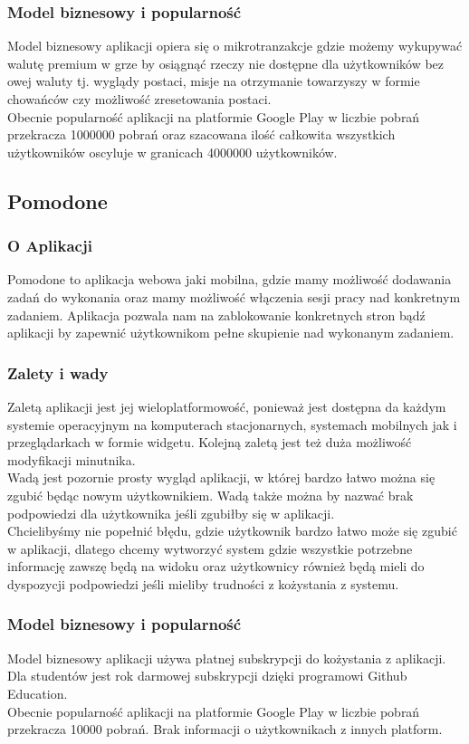 \documentclass[a4paper,11pt]{report}
\begin{document}
\subsubsection{Model biznesowy i popularność}
Model biznesowy aplikacji opiera się o mikrotranzakcje gdzie możemy wykupywać walutę premium w grze by osiągnąć rzeczy nie dostępne dla użytkowników bez owej waluty tj. wyglądy postaci, misje na otrzymanie towarzyszy w formie chowańców czy możliwość zresetowania postaci.\vspace{0,5cm}\\
Obecnie popularność aplikacji na platformie Google Play w liczbie pobrań przekracza 1000000 pobrań oraz szacowana ilość całkowita wszystkich użytkowników oscyluje w granicach 4000000 użytkowników.
\subsection{Pomodone}
\subsubsection{O Aplikacji}
Pomodone to aplikacja webowa jaki mobilna, gdzie mamy możliwość dodawania zadań do wykonania oraz mamy możliwość włączenia sesji pracy nad konkretnym zadaniem. Aplikacja pozwala nam na zablokowanie konkretnych stron bądź aplikacji by zapewnić użytkownikom pełne skupienie nad wykonanym zadaniem.
\subsubsection{Zalety i wady}
Zaletą aplikacji jest jej wieloplatformowość, ponieważ jest dostępna da każdym systemie operacyjnym na komputerach stacjonarnych, systemach mobilnych jak i przeglądarkach w formie widgetu. Kolejną zaletą jest też duża możliwość modyfikacji minutnika.\vspace{0,5cm}\\ Wadą jest pozornie prosty wygląd aplikacji, w której bardzo łatwo można się zgubić będąc nowym użytkownikiem. Wadą także można by nazwać brak podpowiedzi dla użytkownika jeśli zgubiłby się w aplikacji.
\vspace{0,5cm}\\Chcielibyśmy nie popełnić błędu, gdzie użytkownik bardzo łatwo może się zgubić w aplikacji, dlatego chcemy wytworzyć system gdzie wszystkie potrzebne informację zawszę będą na widoku oraz użytkownicy również będą mieli do dyspozycji podpowiedzi jeśli mieliby trudności z kożystania z systemu.
\subsubsection{Model biznesowy i popularność}
Model biznesowy aplikacji używa płatnej subskrypcji do kożystania z aplikacji. Dla studentów jest rok darmowej subskrypcji dzięki programowi Github Education.\vspace{0,5cm}\\
Obecnie popularność aplikacji na platformie Google Play w liczbie pobrań przekracza 10000 pobrań. Brak informacji o użytkownikach z innych platform.
\end{document}
